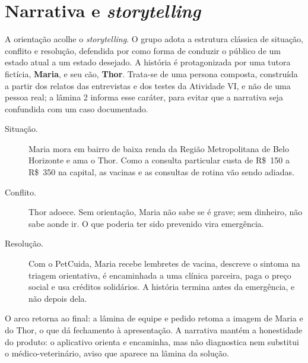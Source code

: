 \section{Narrativa e \textit{storytelling}}
\label{sec:narrativa}

A orientação acolhe o \textit{storytelling}. O grupo adota a estrutura clássica de situação, conflito e resolução, defendida por  como forma de conduzir o público de um estado atual a um estado desejado. A história é protagonizada por uma tutora fictícia, \textbf{Maria}, e seu cão, \textbf{Thor}. Trata-se de uma persona composta, construída a partir dos relatos das entrevistas e dos testes da Atividade VI, e não de uma pessoa real; a lâmina 2 informa esse caráter, para evitar que a narrativa seja confundida com um caso documentado.

\begin{description}
  \item[Situação.] Maria mora em bairro de baixa renda da Região Metropolitana de Belo Horizonte e ama o Thor. Como a consulta particular custa de R\$~150 a R\$~350 na capital, as vacinas e as consultas de rotina vão sendo adiadas.
  \item[Conflito.] Thor adoece. Sem orientação, Maria não sabe se é grave; sem dinheiro, não sabe aonde ir. O que poderia ter sido prevenido vira emergência.
  \item[Resolução.] Com o PetCuida, Maria recebe lembretes de vacina, descreve o sintoma na triagem orientativa, é encaminhada a uma clínica parceira, paga o preço social e usa créditos solidários. A história termina antes da emergência, e não depois dela.
\end{description}

O arco retorna ao final: a lâmina de equipe e pedido retoma a imagem de Maria e do Thor, o que dá fechamento à apresentação. A narrativa mantém a honestidade do produto: o aplicativo orienta e encaminha, mas não diagnostica nem substitui o médico-veterinário, aviso que aparece na lâmina da solução.
